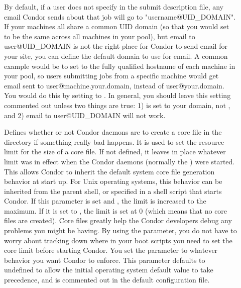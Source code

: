 \begin{description}
\item[] \label{param:EmailDomain}
  By default, if a user does not specify  in the
  submit description file, any email Condor sends about that job will
  go to "username@UID\_DOMAIN".
  If your machines all share a common UID domain (so that you would
  set  to be the same across all machines in your
  pool), but email to user@UID\_DOMAIN is not the right place for
  Condor to send email for your site, you can define the default
  domain to use for email.
  A common example would be to set  to the fully
  qualified hostname of each machine in your pool, so users submitting
  jobs from a specific machine would get email sent to
  user@machine.your.domain, instead of user@your.domain.  
  You would do this by setting  to
  . 
  In general, you should leave this setting commented out unless two
  things are true: 1)  is set to your domain, not
  , and 2) email to user@UID\_DOMAIN will not 
  work. 
  
\item[] \label{param:CreateCoreFiles}
  Defines whether or not Condor daemons are to
  create a core file in the  directory
  if something really bad happens.  It is
  used to set
  the resource limit for the size of a core file.  If not defined,
  it leaves in place whatever limit was in effect
  when the Condor daemons (normally the ) were started.
  This allows Condor to inherit the default system core file generation
  behavior at start up.  For Unix operating systems, this behavior can
  be inherited from the parent shell, or specified in a shell script
  that starts Condor.
  If this parameter is set and , the limit is increased to
  the maximum.  If it is set to , the limit is set at 0
  (which means that no core files are created).  Core files
  greatly help the Condor developers debug any problems you might be
  having.  By using the parameter, you do not have to worry about
  tracking down where in your boot scripts you need to set the core
  limit before starting Condor. You set the parameter
  to whatever behavior you want Condor to enforce.  This parameter
  defaults to undefined to allow the initial operating system default
  value to take precedence, 
  and is commented out in the default configuration file. 


\end{description}
